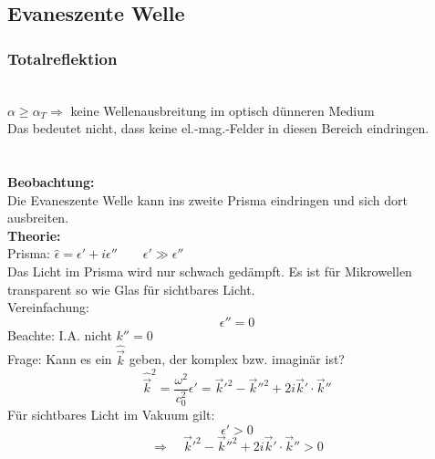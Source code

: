 
\subsection{Evaneszente Welle}

\subsubsection{Totalreflektion}

\\
$ \alpha \ge \alpha_T \Rightarrow $ keine Wellenausbreitung im optisch dünneren Medium\\[5pt]
Das bedeutet nicht, dass keine el.-mag.-Felder in diesen Bereich eindringen.\\
\\
\\
\textbf{Beobachtung:}\\
Die Evaneszente Welle kann ins zweite Prisma eindringen und sich dort ausbreiten.\\
\textbf{Theorie:}\\
Prisma: $ \hat{\epsilon} = \epsilon' + i \epsilon''  \qquad \epsilon' \gg \epsilon''$\\
Das Licht im Prisma wird nur schwach gedämpft. Es ist für Mikrowellen transparent so wie Glas für sichtbares Licht.\\
Vereinfachung:
\begin{equation*}
\epsilon'' = 0
\end{equation*}
Beachte: I.A. nicht $ k'' = 0 $\\[5pt]
Frage: Kann es ein $ \hat{\vec{k}} $ geben, der komplex bzw. imaginär ist?
\begin{equation*}
\hat{\vec{k}}^2 = \frac{\omega^2}{c_0^2} \epsilon' = \vec{k}'^2 - \vec{k}''^2 + 2 i \vec{k}' \cdot \vec{k}''
\end{equation*}
Für sichtbares Licht im Vakuum gilt:
\begin{equation*}
\epsilon' > 0
\end{equation*}
\begin{equation*}
\Rightarrow \quad \vec{k}'^2 - \vec{k}''^2 + 2 i \vec{k}' \cdot \vec{k}'' > 0
\end{equation*}
